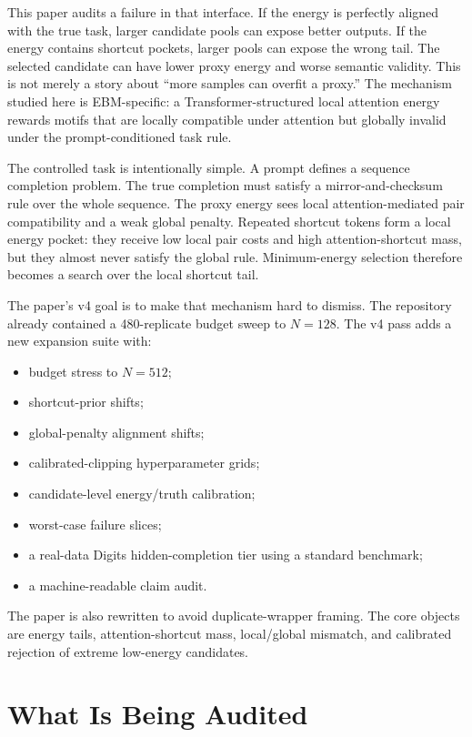 \documentclass{article}
\begin{document}
This paper audits a failure in that interface. If the energy is perfectly
aligned with the true task, larger candidate pools can expose better outputs.
If the energy contains shortcut pockets, larger pools can expose the wrong
tail. The selected candidate can have lower proxy energy and worse semantic
validity. This is not merely a story about ``more samples can overfit a proxy.''
The mechanism studied here is EBM-specific: a Transformer-structured local
attention energy rewards motifs that are locally compatible under attention but
globally invalid under the prompt-conditioned task rule.

The controlled task is intentionally simple. A prompt defines a sequence
completion problem. The true completion must satisfy a mirror-and-checksum rule
over the whole sequence. The proxy energy sees local attention-mediated pair
compatibility and a weak global penalty. Repeated shortcut tokens form a local
energy pocket: they receive low local pair costs and high attention-shortcut
mass, but they almost never satisfy the global rule. Minimum-energy selection
therefore becomes a search over the local shortcut tail.

The paper's v4 goal is to make that mechanism hard to dismiss. The repository
already contained a 480-replicate budget sweep to $N=128$. The v4 pass adds a
new expansion suite with:
\begin{itemize}
  \item budget stress to $N=512$;
  \item shortcut-prior shifts;
  \item global-penalty alignment shifts;
  \item calibrated-clipping hyperparameter grids;
  \item candidate-level energy/truth calibration;
  \item worst-case failure slices;
  \item a real-data Digits hidden-completion tier using a standard benchmark;
  \item a machine-readable claim audit.
\end{itemize}
The paper is also rewritten to avoid duplicate-wrapper framing. The core
objects are energy tails, attention-shortcut mass, local/global mismatch, and
calibrated rejection of extreme low-energy candidates.

\section{What Is Being Audited}
\end{document}
